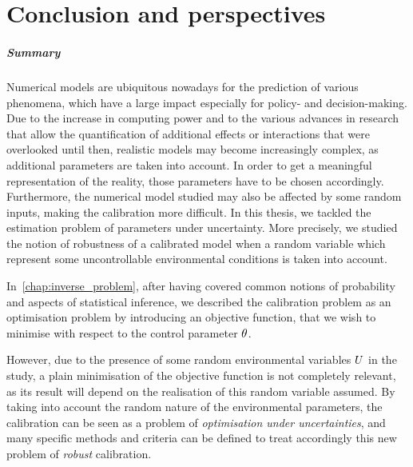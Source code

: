 \documentclass[../../Main_ManuscritThese.tex]{subfiles}
\begin{document}
\pagestyle{conclusionStyle}



\TitleBtwLines
\chapter*{Conclusion and perspectives}
{}
\label{chap:Conclusion}
\renewcommand{\thesection}{} %

\paragraph{Summary}

Numerical models are ubiquitous nowadays for the prediction of various
phenomena, which have a large impact especially for policy- and
decision-making.  Due to the increase in computing power and to the
various advances in research that allow the quantification of
additional effects or interactions that were overlooked until then,
realistic models may become increasingly complex, as additional
parameters are taken into account. In order to get a meaningful
representation of the reality, those parameters have to be chosen
accordingly. Furthermore, the numerical model studied may also be
affected by some random inputs, making the calibration more
difficult. In this thesis, we tackled the estimation problem of
parameters under uncertainty. More precisely, we studied the notion of
robustness of a calibrated model when a random variable which
represent some uncontrollable environmental conditions is taken into
account.


In~\cref{chap:inverse_problem}, after having covered common notions
of probability and aspects of statistical inference, we described 
the calibration problem as an optimisation problem by introducing an
objective function, that we wish to minimise with respect to the
control parameter $\theta$.

However, due to the presence of some random environmental variables
$U$ in the study, a plain minimisation of the objective function is
not completely relevant, as its result will depend on the realisation of this
random variable assumed.  By
taking into account the random nature of the {environmental
  parameters}, the calibration can be seen as a problem of
\emph{optimisation under uncertainties}, and many specific methods and
criteria can be defined to treat accordingly this new problem of
\emph{robust} calibration.
\end{document}
